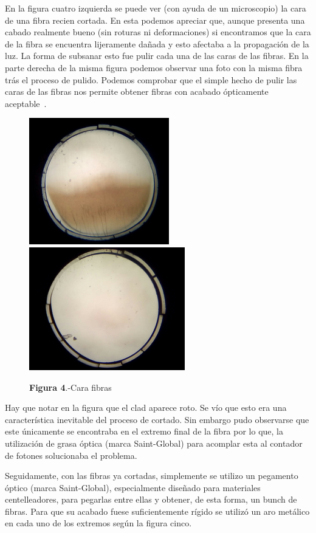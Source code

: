 En la figura cuatro izquierda se puede ver (con ayuda de un microscopio) la cara de una fibra recien cortada. En esta podemos apreciar que, aunque presenta una cabado realmente bueno (sin roturas ni deformaciones) si encontramos que la cara de la fibra se encuentra lijeramente dañada y esto afectaba a la propagación de la luz. La forma de subsanar esto fue pulir cada una de las caras de las fibras. En la parte derecha de la misma figura podemos observar una foto con la misma fibra trás el proceso de pulido. Podemos comprobar que el simple hecho de pulir las caras de las fibras nos permite obtener fibras con acabado ópticamente aceptable~\cite{manual}.

\begin{figure}[htb]
\centering
{
\includegraphics[scale=0.5]{SinPulir.png} 
}
{
\includegraphics[scale=0.5]{Pulida.png} 
}
\caption{\textbf{Figura 4}.-Cara fibras}
\end{figure} 

Hay que notar en la figura que el clad aparece roto. Se vío que esto era una característica inevitable del proceso de cortado. Sin embargo pudo observarse que este únicamente se encontraba en el extremo final de la fibra por lo que, la utilización de grasa óptica (marca Saint-Global) para acomplar esta al contador de fotones solucionaba el problema.

Seguidamente, con las fibras ya cortadas, simplemente se utilizo un pegamento óptico (marca Saint-Global), especialmente diseñado para materiales centelleadores, para pegarlas entre ellas y obtener, de esta forma, un bunch de fibras. Para que su acabado fuese suficientemente rígido se utilizó un aro metálico en cada uno de los extremos según la figura cinco.

